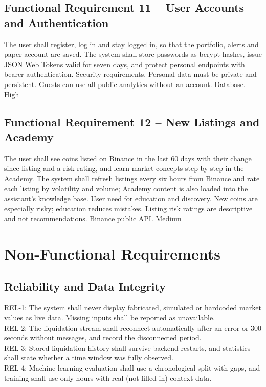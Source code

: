 \subsection{Functional Requirement 11 -- User Accounts and Authentication}
{The user shall register, log in and stay logged in, so that the portfolio, alerts and paper account are saved.}
{The system shall store passwords as bcrypt hashes, issue JSON Web Tokens valid for seven days, and protect personal endpoints with bearer authentication.}
{Security requirements.}
{Personal data must be private and persistent.}
{Guests can use all public analytics without an account.}
{Database.}
{High}

\subsection{Functional Requirement 12 -- New Listings and Academy}
{The user shall see coins listed on Binance in the last 60 days with their change since listing and a risk rating, and learn market concepts step by step in the Academy.}
{The system shall refresh listings every six hours from Binance and rate each listing by volatility and volume; Academy content is also loaded into the assistant's knowledge base.}
{User need for education and discovery.}
{New coins are especially risky; education reduces mistakes.}
{Listing risk ratings are descriptive and not recommendations.}
{Binance public API.}
{Medium}

\section{Non-Functional Requirements}
\subsection{Reliability and Data Integrity}
REL-1: The system shall never display fabricated, simulated or hardcoded market values as live data. Missing inputs shall be reported as unavailable.\\
REL-2: The liquidation stream shall reconnect automatically after an error or 300 seconds without messages, and record the disconnected period.\\
REL-3: Stored liquidation history shall survive backend restarts, and statistics shall state whether a time window was fully observed.\\
REL-4: Machine learning evaluation shall use a chronological split with gaps, and training shall use only hours with real (not filled-in) context data.

